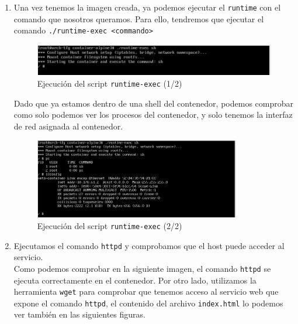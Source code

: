 \documentclass[a4paper, oneside, 12pt]{book}
\begin{document}
\begin{enumerate}
		
		\item Una vez tenemos la imagen creada, ya podemos ejecutar el \texttt{runtime} con el comando que nosotros queramos. Para ello, tendremos que ejecutar el comando \texttt{./runtime-exec <commando>}
		
		\begin{figure}[h!]
			\begin{center}
				\includegraphics[width=1\textwidth]{img/container_runtime1.png}
				\caption{Ejecución del script \texttt{runtime-exec} (1/2)}
			\end{center}
		\end{figure}
	
		\noindent Dado que ya estamos dentro de una shell del contenedor, podemos comprobar como solo podemos ver los procesos del contenedor, y solo tenemos la interfaz de red asignada al contenedor.
		
		\begin{figure}[h!]
			\begin{center}
				\includegraphics[width=0.85\textwidth]{img/container_runtime2.png}
				\caption{Ejecución del script \texttt{runtime-exec} (2/2)}
			\end{center}
		\end{figure}
	
		\item Ejecutamos el comando \texttt{httpd} y comprobamos que el host puede acceder al servicio. \\
		
		\noindent Como podemos comprobar en la siguiente imagen, el comando \texttt{httpd} se ejecuta correctamente en el contenedor. Por otro lado, utilizamos la herramienta \texttt{wget} para comprobar que tenemos acceso al servicio web que expone el comando \texttt{httpd}, el contenido del archivo \texttt{index.html} lo podemos ver también en las siguientes figuras.
		

\end{enumerate}
\end{document}
